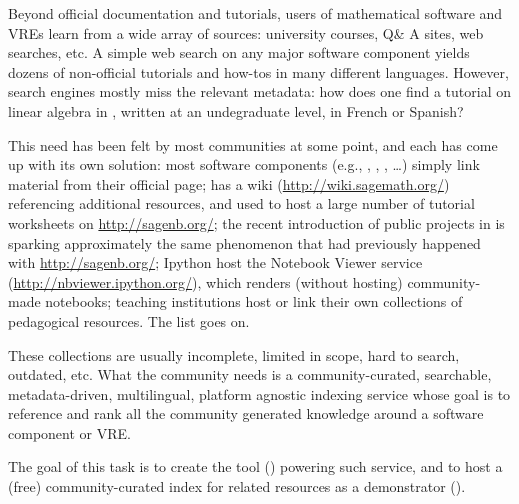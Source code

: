 \begin{workpackage}
\begin{tasklist}
\begin{task}[title=Demonstrator: Interactive books,
id=ibook,lead=US,PM=30]
\end{task}

\begin{task}[title=Demonstrator: Computational mathematics resources indexing service,
id=index-librorum-salvificorum,lead=UV,PM=2,partners={UB}] Beyond official documentation and
  tutorials, users of mathematical software and VREs learn from a wide
  array of sources: university courses, Q\& A sites, web searches,
  etc.  A simple web search on any major software component yields
  dozens of non-official tutorials and how-tos in many different
  languages. However, search engines mostly miss the relevant
  metadata: how does one find a tutorial on linear algebra in \PariGP,
  written at an undegraduate level, in French or Spanish?

This need has been felt by most communities at some point, and each
has come up with its own solution: most software components (e.g.,
\GAP, \PariGP, \Sage, \dots) simply link material from their official
page; \Sage has a wiki (\url{http://wiki.sagemath.org/}) referencing
additional resources, and used to host a large number of tutorial
worksheets on \url{http://sagenb.org/}; the recent introduction of
public projects in \SMC is sparking approximately the same phenomenon
that had previously happened with \url{http://sagenb.org/}; Ipython
host the Notebook Viewer service (\url{http://nbviewer.ipython.org/}),
which renders (without hosting) community-made notebooks; teaching
institutions host or link their own collections of pedagogical
resources. The list goes on.

These collections are usually incomplete, limited in scope, hard to
search, outdated, etc.  What the community needs is a
community-curated, searchable, metadata-driven, multilingual, platform
agnostic indexing service whose goal is to reference and rank all the
community generated knowledge around a software component or VRE.

The goal of this task is to create the tool
() powering such service, and to host a
(free) community-curated index for \TheProject related resources as a
demonstrator ().

\end{task}
\end{tasklist}




\end{workpackage}
